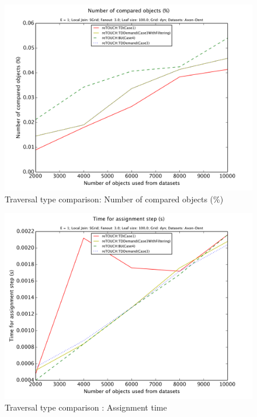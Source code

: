\documentclass{sig-alternate}
\begin{document}
\begin{figure}[htb]
    \begin{center}
        \includegraphics[width=\columnwidth]{traversalTypeFixed/objnum}
        \caption{Traversal type comparison: Number of compared objects (\%)}
        \label{fig:traversal:objnum}
      \end{center}
\end{figure}

\begin{figure}[htb]
    \begin{center}
        \includegraphics[width=\columnwidth]{traversalTypeFixed/assignment}
        \caption{Traversal type comparison : Assignment time}
        \label{fig:traversal:assignment}
      \end{center}
\end{figure}
\end{document}
